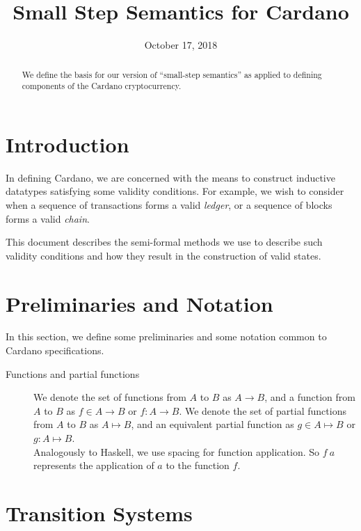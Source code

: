 \documentclass[11pt,a4paper]{article}
\theoremstyle{definition}
\theoremstyle{remark}
\begin{document}
\title{Small Step Semantics for Cardano}
\author{}
\date{October 17, 2018}

\maketitle

\begin{abstract}
We define the basis for our version of ``small-step semantics'' as applied to
defining components of the Cardano cryptocurrency.
\end{abstract}

\section{Introduction}
\label{sec:introduction}

In defining Cardano, we are concerned with the means to construct inductive
datatypes satisfying some validity conditions. For example, we wish to consider
when a sequence of transactions forms a valid \textit{ledger}, or a sequence of
blocks forms a valid \textit{chain}.

This document describes the semi-formal methods we use to describe such validity
conditions and how they result in the construction of valid states.

\section{Preliminaries and Notation}

In this section, we define some preliminaries and some notation common to
Cardano specifications.

\begin{description}
\item [Functions and partial functions] We denote the set of functions from $A$
  to $B$ as $A \to B$, and a function from $A$ to $B$ as $f \in A \to B$ or $f :
  A \to B$. We
  denote the set of partial functions from $A$ to $B$ as $A \mapsto B$, and an
  equivalent partial function as $g \in A \mapsto B$ or $g : A \mapsto B$. \\
  Analogously to Haskell, we use spacing for function application. So $f ~ a$
  represents the application of $a$ to the function $f$.

\end{description}


\section{Transition Systems}
\label{sec:preliminaries}
\end{document}
